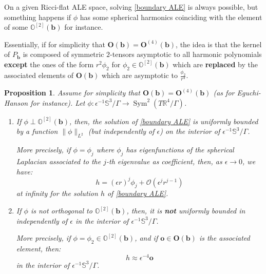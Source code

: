 \documentclass[12pt]{article}
\newtheorem{prop}[thm]{Proposition}
\begin{document}
   On a given Ricci-flat ALE space, solving \eqref{boundary ALE} is always possible, but something happens if $\phi$ has some spherical harmonics coinciding with the element of some $\mathbb{O}^{[2]}(\mathbf{b})$ for instance. 
   
   Essentially, if for simplicity that $\mathbf{O}(\mathbf{b}) = \mathbf{O}^{(4)}(\mathbf{b})$, the idea is that the kernel of $P_{\mathbf{b}}$ is composed of symmetric $2$-tensors asymptotic to all harmonic polynomials \textbf{except} the ones of the form $r^2\phi_2$ for $\phi_2\in\mathbb{O}^{[2]}(\mathbf{b})$ which are \textbf{replaced} by the associated elements of $\mathbf{O}(\mathbf{b})$ which are asymptotic to $\frac{\phi_2}{r^4}$.
   
   
   \begin{prop}
        Assume for simplicity that $\mathbf{O}(\mathbf{b}) = \mathbf{O}^{(4)}(\mathbf{b})$ (as for Eguchi-Hanson for instance). Let $\phi: \epsilon^{-1}\mathbb{S}^3\slash\Gamma \to \operatorname{Sym}^2(T\mathbb{R}^4\slash\Gamma)$.
        
        \begin{enumerate}
            \item If $\phi \perp \mathbb{O}^{[2]}(\mathbf{b})$, then, the solution of \eqref{boundary ALE} is uniformly bounded by a function $\|\phi\|_{L^2}$ (but independently of $\epsilon$) on the interior of $\epsilon^{-1}\mathbb{S}^3\slash\Gamma$.
            
            More precisely, if $\phi = \phi_j$ where $\phi_j$ has eigenfunctions of the spherical Laplacian associated to the $j$-th eigenvalue as coefficient, then, as $\epsilon\to 0$, we have:
            $$ h = (\epsilon r)^j\phi_j + \mathcal{O}(\epsilon^j r^{j-1}) $$
            at infinity for the solution $h$ of \eqref{boundary ALE}.
            \item If $\phi$ is not orthogonal to $\mathbb{O}^{[2]}(\mathbf{b})$, then, it is \textbf{not} uniformly bounded in independently of $\epsilon$ in the interior of $\epsilon^{-1}\mathbb{S}^3\slash\Gamma$.
            
            More precisely, if $\phi = \phi_2 \in \mathbb{O}^{[2]}(\mathbf{b})$, and if $\mathbf{o}\in\mathbf{O}(\mathbf{b})$ is the associated element, then:
            $$ h \approx \epsilon^{-4}\mathbf{o} $$
            in the interior of $\epsilon^{-1}\mathbb{S}^3\slash\Gamma$.
        \end{enumerate}
   \end{prop}
   
\end{document}
